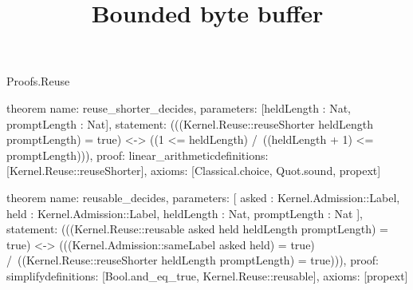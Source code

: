 \begin{lexlean}{Proofs.Reuse}
\title{Bounded byte buffer}
\begin{semanticmodule}
theorem{
  name: reuse_shorter_decides,
  parameters: [heldLength : Nat, promptLength : Nat],
  statement: (((Kernel.Reuse::reuseShorter heldLength promptLength) = true) <-> ((1 <= heldLength) /\ ((heldLength + 1) <= promptLength))),
  proof: linear_arithmetic{definitions: [Kernel.Reuse::reuseShorter]},
  axioms: [Classical.choice, Quot.sound, propext]
}

theorem{
  name: reusable_decides,
  parameters: [
    asked : Kernel.Admission::Label,
    held : Kernel.Admission::Label,
    heldLength : Nat,
    promptLength : Nat
  ],
  statement: (((Kernel.Reuse::reusable asked held heldLength promptLength) = true) <-> (((Kernel.Admission::sameLabel asked held) = true) /\ ((Kernel.Reuse::reuseShorter heldLength promptLength) = true))),
  proof: simplify{definitions: [Bool.and_eq_true, Kernel.Reuse::reusable]},
  axioms: [propext]
}
\end{semanticmodule}
\end{lexlean}
